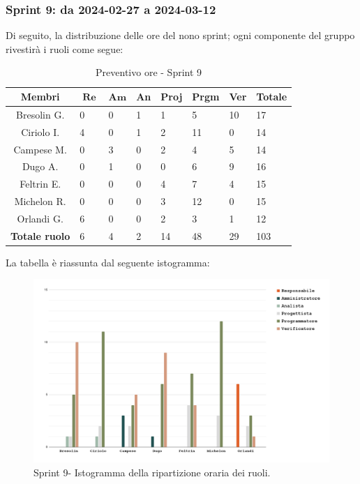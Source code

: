 \documentclass[10pt, a4paper]{article}
\begin{document}
{{{{{{{{{{{{{{{{\subsubsection{Sprint 9: da 2024-02-27 a 2024-03-12}
Di seguito, la distribuzione delle ore del nono sprint; ogni componente del gruppo rivestirà i ruoli come segue:
\begin{table}[H]
\begin{tabularx}{\textwidth}{c|X|X|X|X|X|X|X}
    \textbf{Membri} & $\operatorname{\textbf{Re}}$ & $\mathrm{\textbf{Am}}$ & \textbf{An} & \textbf{Proj} & \textbf{Prgm} & \textbf{Ver} & \textbf{Totale} \\
        \hline Bresolin G. & 0 & 0 & 1 & 1 & 5 & \cellcolor{primarycolor}10 & 17 \\
        \hline Ciriolo I.  & 4 & 0 & 1 & 2 & \cellcolor{primarycolor}11 & 0 & 14 \\
        \hline Campese M.  & 0 & 3 & 0 & 2 & \cellcolor{primarycolor}4 & 5 & 14 \\
        \hline Dugo A.     & 0 & 1 & 0 & 0 & 6 & \cellcolor{primarycolor}9 & 16 \\
        \hline Feltrin E.  & 0 & 0 & 0 & \cellcolor{primarycolor}4 & 7 & 4 & 15 \\
        \hline Michelon R. & 0 & 0 & 0 & 3 & \cellcolor{primarycolor}12 & 0 & 15 \\
        \hline Orlandi G.  & \cellcolor{primarycolor}6 & 0 & 0 & 2 & 3 & 1 & 12 \\
        \hline
        \textbf{Totale ruolo} & 6 & 4 & 2 & 14 & 48 & 29 & 103 
    \end{tabularx}
    \caption{Preventivo ore - Sprint 9}
    \end{table}

La tabella è riassunta dal seguente istogramma:
 \begin{figure}[H]
        \centering        
        \includegraphics[width=15.5cm]{istogrammi/istogramma_9_periodo.png}
        \caption{Sprint 9- Istogramma della ripartizione oraria dei ruoli. }
    \end{figure}

}}}}}}}}}}}}}}}}
\end{document}
